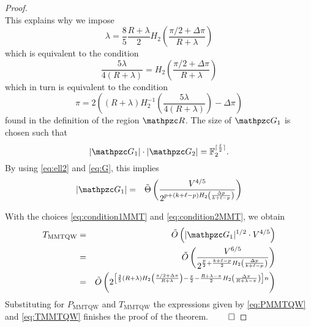 \begin{proof}
$$$$
This explains why we impose 
$$
\lambda = \frac{8}{5}\frac{R+\lambda}{2} H_2\left(\frac{\pi/2+\Delta \pi}{R+\lambda}\right)
$$
which is equivalent to the condition 
$$
\frac{5 \lambda}{4(R+\lambda)} = H_2\left(\frac{\pi/2+\Delta \pi}{R+\lambda}\right)
$$
which in turn is equivalent to the condition
\begin{equation}\label{eq:condition2MMT}
\pi = 2\left((R+\lambda)H_2^{-1}\left(\frac{5\lambda}{4(R+\lambda)}\right) - \Delta \pi\right)
\end{equation}
found in the definition of the region $\zR$.
The size of $\zG_1$ is chosen such that
\begin{equation}\label{eq:condition1MMT}
|\zG_1| \cdot |\zG_2| = \Ft^{\lceil \frac{\ell}{2} \rceil}.
\end{equation}
By using \eqref{eq:ell2} and \eqref{eq:G}, this implies
\begin{eqnarray}
|\zG_1| & = & \Tht{\frac{V^{4/5}}{2^{p+ (k+\ell-p)H_2\left( \frac{\Delta p}{k+\ell -p} \right)}}}
\end{eqnarray}

With the choices \eqref{eq:condition1MMT} and \eqref{eq:condition2MMT}, 
we obtain
\begin{eqnarray}
T_{\text{MMTQW}} &= &\OOt{|\zG_1|^{1/2} \cdot V^{4/5}} \nonumber \\
& = & \OOt{\frac{V^{6/5}}{2^{\frac{p}{2}+ \frac{k+\ell-p}{2} H_2\left( \frac{\Delta p}{k+\ell -p} \right)}}} \nonumber \\
& = & \OOt{ 2^{\left[\frac{3}{5}(R+\lambda)H_2\left( \frac{\pi/2 +\Delta \pi}{R+\lambda} \right)- \frac{\pi}{2} - \frac{R+\lambda-\pi}{2} H_2\left( \frac{\Delta \pi}{R+\lambda -
\pi} \right) \right]n}}\label{eq:TMMTQW}
\end{eqnarray}
Substituting for $P_{\text{MMTQW}}$ and $T_{\text{MMTQW}}$ the expressions given by \eqref{eq:PMMTQW} and \eqref{eq:TMMTQW} finishes the proof of the
theorem.$~\qed$
\end{proof}
